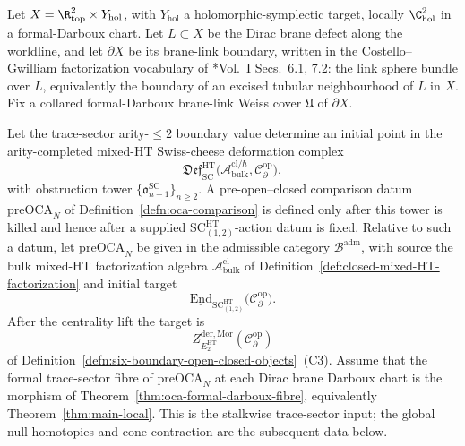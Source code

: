 \documentclass[11pt]{memoir}
\begin{document}
\begin{thm}\label{thm:main-global-deligne-criterion}
  Let \(X=\R^2_{\mathrm{top}}\times Y_{\mathrm{hol}}\), with
  \(Y_{\mathrm{hol}}\) a holomorphic-symplectic target, locally
  \(\C^2_{\mathrm{hol}}\) in a formal-Darboux chart.  Let
  \(L\subset X\) be the Dirac brane defect along the worldline, and let
  \(\partial X\) be its brane-link boundary, written in the
  Costello--Gwilliam factorization vocabulary of
  \cite{costello-gwilliam}*{Vol.~I Secs.~6.1, 7.2}: the link sphere bundle over \(L\),
  equivalently the boundary of an excised tubular neighbourhood of \(L\)
  in \(X\).  Fix a collared formal-Darboux brane-link Weiss cover
  \(\mathfrak U\) of \(\partial X\).

  Let the trace-sector arity-\(\le2\) boundary value determine an
  initial point in the arity-completed mixed-HT Swiss-cheese deformation
  complex
  \[
    \mathfrak{Def}^{\mathrm{HT}}_{\mathrm{SC}}
    \bigl(\mathcal A^{\mathrm{cl}/\hbar}_{\mathrm{bulk}},
    \mathcal C^{\mathrm{op}}_\partial\bigr),
  \]
  with obstruction tower
  \(\{\mathfrak o^{\mathrm{SC}}_{n+1}\}_{n\ge2}\).  A
  pre-open--closed comparison datum
  \(\mathrm{preOCA}_N\) of Definition~\ref{defn:oca-comparison} is
  defined only after this tower is killed and hence after a supplied
  \(\mathrm{SC}^{\mathrm{HT}}_{(1,2)}\)-action datum is fixed.  Relative
  to such a datum, let \(\mathrm{preOCA}_N\) be given in the admissible
  category \(\mathcal B^{\mathrm{adm}}\), with source the bulk mixed-HT
  factorization algebra
  \(\mathcal A^{\mathrm{cl}}_{\mathrm{bulk}}\) of
  Definition~\ref{def:closed-mixed-HT-factorization} and initial target
  \[
    \underline{\mathrm{End}}_{\mathrm{SC}^{\mathrm{HT}}_{(1,2)}}\!
    \bigl(\mathcal C^{\mathrm{op}}_\partial\bigr).
  \]
  After the centrality lift the target is
  \[
    Z^{\mathrm{der},\mathrm{Mor}}_{E_2^{\mathrm{HT}}}
    (\mathcal C^{\mathrm{op}}_\partial)
  \]
  of Definition~\ref{defn:six-boundary-open-closed-objects}~(C3).
  Assume that the formal trace-sector fibre of \(\mathrm{preOCA}_N\) at
  each Dirac brane Darboux chart is the morphism of
  Theorem~\ref{thm:oca-formal-darboux-fibre}, equivalently
  Theorem~\ref{thm:main-local}.  This is the stalkwise trace-sector
  input; the global null-homotopies and cone contraction are the
  subsequent data below.


\end{thm}
\end{document}
